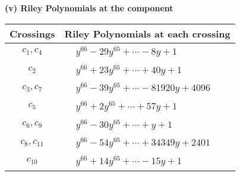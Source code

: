 \documentclass[1p]{elsarticle_modified}
\theoremstyle{definition}
\begin{document}
\newpage\renewcommand{\arraystretch}{1}
\flushleft \textbf{(v) Riley Polynomials at the component}\newline \\
\begin{tabular}{m{50pt}|m{274pt}}
Crossings & \hspace{64pt}Riley Polynomials at each crossing \\
\hline $$\begin{aligned}c_{1},c_{4}\end{aligned}$$&$\begin{aligned}
&y^{66}-29 y^{65}+\cdots-8 y+1
\end{aligned}$\\
\hline $$\begin{aligned}c_{2}\end{aligned}$$&$\begin{aligned}
&y^{66}+23 y^{65}+\cdots+40 y+1
\end{aligned}$\\
\hline $$\begin{aligned}c_{3},c_{7}\end{aligned}$$&$\begin{aligned}
&y^{66}-39 y^{65}+\cdots-81920 y+4096
\end{aligned}$\\
\hline $$\begin{aligned}c_{5}\end{aligned}$$&$\begin{aligned}
&y^{66}+2 y^{65}+\cdots+57 y+1
\end{aligned}$\\
\hline $$\begin{aligned}c_{6},c_{9}\end{aligned}$$&$\begin{aligned}
&y^{66}-30 y^{65}+\cdots+y+1
\end{aligned}$\\
\hline $$\begin{aligned}c_{8},c_{11}\end{aligned}$$&$\begin{aligned}
&y^{66}-54 y^{65}+\cdots+34349 y+2401
\end{aligned}$\\
\hline $$\begin{aligned}c_{10}\end{aligned}$$&$\begin{aligned}
&y^{66}+14 y^{65}+\cdots-15 y+1
\end{aligned}$\\
\hline
\end{tabular}\\~\\
\end{document}

